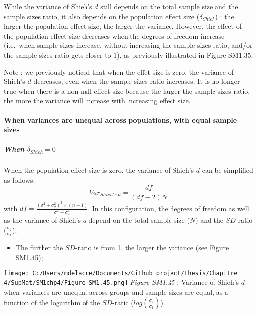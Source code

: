 \documentclass[
  english,
  man,mask,floatsintext]{apa6}
\providecommand{\tightlist}{%
  \setlength{\itemsep}{0pt}\setlength{\parskip}{0pt}}
\let\oldparagraph\paragraph
\renewcommand{\paragraph}[1]{\oldparagraph{#1}\mbox{}}
\let\oldsubparagraph\subparagraph
\renewcommand{\subparagraph}[1]{\oldsubparagraph{#1}\mbox{}}
\begin{document}
While the variance of Shieh's \(d\) still depends on the total sample size and the sample sizes ratio, it also depends on the population effect size (\(\delta_{Shieh}\)) : the larger the population effect size, the larger the variance. However, the effect of the population effect size decreases when the degrees of freedom increase (i.e.~when sample sizes increase, without increasing the sample sizes ratio, and/or the sample sizes ratio gets closer to 1), as previously illustrated in Figure SM1.35.

Note : we previously noticed that when the effet size is zero, the variance of Shieh's \(d\) decreases, even when the sample sizes ratio increases. It is no longer true when there is a non-null effect size because the larger the sample sizes ratio, the more the variance will increase with increasing effect size.

\newpage

\hypertarget{when-variances-are-unequal-across-populations-with-equal-sample-sizes-4}{%
\paragraph{When variances are unequal across populations, with equal sample sizes}\label{when-variances-are-unequal-across-populations-with-equal-sample-sizes-4}}

\hypertarget{when-delta_shieh-0-1}{%
\subparagraph{\texorpdfstring{When \(\delta_{Shieh} = 0\)}{When \textbackslash delta\_\{Shieh\} = 0}}\label{when-delta_shieh-0-1}}

When the population effect size is zero, the variance of Shieh's \(d\) can be simplified as follows:
\[Var_{Shieh's \; d} = \frac{df}{(df-2)N}\]
with \(df = \frac{(\sigma_1^2+\sigma_2^2)^2 \times (n-1)}{\sigma_1^4+\sigma_2^4}\). In this configuration, the degrees of freedom as well as the variance of Shieh's \(d\) depend on the total sample size (\(N\)) and the \(SD\)-ratio (\(\frac{\sigma_2}{\sigma_1}\)).

\begin{itemize}
\tightlist
\item
  The further the \(SD\)-ratio is from 1, the larger the variance (see Figure SM1.45);
\end{itemize}

\texttt{[image: C:/Users/mdelacre/Documents/Github project/thesis/Chapitre 4/SupMat/SM1chp4/Figure SM1.45.png]}
\emph{Figure SM1.45} : Variance of Shieh's \(d\) when variances are unequal across groups and sample sizes are equal, as a function of the logarithm of the \(SD\)-ratio (\(log \left( \frac{\sigma_2}{\sigma_1} \right)\)).
\end{document}
